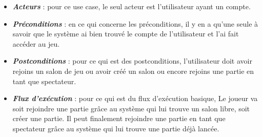 \documentclass[10pt,a4paper]{article}
\begin{document}
\begin{itemize}
\item \textit{\textbf{Acteurs}} : pour ce use case, le seul acteur est l'utilisateur ayant un compte.\\

\item \textit{\textbf{Préconditions}} : en ce qui concerne les préconditions, il y en a qu'une seule à savoir que le système ai bien trouvé le compte de l'utilisateur et l'ai fait accéder au jeu.\\

\item \textit{\textbf{Postconditions}} : pour ce qui est des postconditions, l'utilisateur doit avoir rejoins un salon de jeu ou avoir créé un salon ou encore rejoins une partie en tant que spectateur.\\

\item \textit{\textbf{Flux d'exécution}} : pour ce qui est du flux d'exécution basique, Le joueur va soit rejoindre une partie grâce au système qui lui trouve un salon libre, soit créer une partie. Il peut finalement rejoindre une partie en tant que spectateur grâce au système qui lui trouve une partie déjà lancée. \\

\end{itemize} 
\newpage
\end{document}
